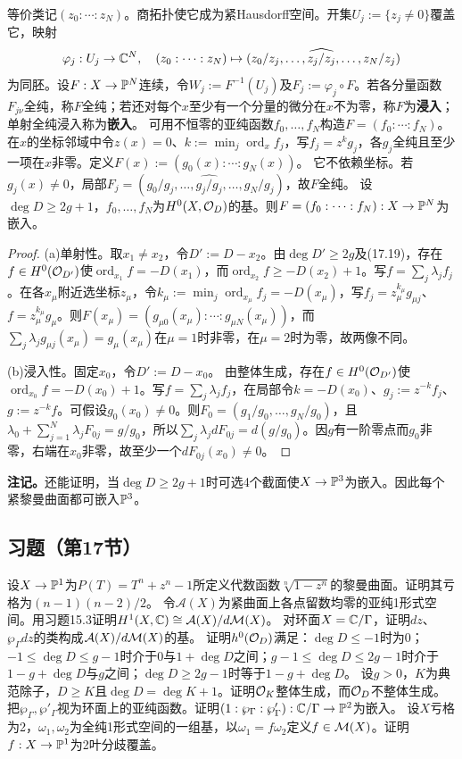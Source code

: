 等价类记$(z_0:\cdots:z_N)$。商拓扑使它成为紧Hausdorff空间。开集$U_j:=\{z_j\ne0\}$覆盖它，映射
\[
\varphi_j:U_j\to\mathbb C^N,\quad(z_0:\cdots:z_N)\mapsto(z_0/z_j,\ldots,\widehat{z_j/z_j},\ldots,z_N/z_j)
\]
为同胚。设$F:X\to\mathbb P^N$连续，令$W_j:=F^{-1}(U_j)$及$F_j:=\varphi_j\circ F$。若各分量函数$F_{j\nu}$全纯，称$F$全纯；若还对每个$x$至少有一个分量的微分在$x$不为零，称$F$为\textbf{浸入}；单射全纯浸入称为\textbf{嵌入}。
可用不恒零的亚纯函数$f_0,\ldots,f_N$构造$F=(f_0:\cdots:f_N)$。在$x$的坐标邻域中令$z(x)=0$、$k:=\min_j\operatorname{ord}_xf_j$，写$f_j=z^kg_j$，各$g_j$全纯且至少一项在$x$非零。定义$F(x):=(g_0(x):\cdots:g_N(x))$。
它不依赖坐标。若$g_j(x)\ne0$，局部$F_j=(g_0/g_j,\ldots,\widehat{g_j/g_j},\ldots,g_N/g_j)$，故$F$全纯。
设$\deg D\ge2g+1$，$f_0,\ldots,f_N$为$H^0(X,\mathcal O_D)$的基。则$F=(f_0:\cdots:f_N):X\to\mathbb P^N$为嵌入。
\begin{proof}
(a)单射性。取$x_1\ne x_2$，令$D':=D-x_2$。由$\deg D'\ge2g$及(17.19)，存在$f\in H^0(\mathcal O_{D'})$使$\operatorname{ord}_{x_1}f=-D(x_1)$，而$\operatorname{ord}_{x_2}f\ge-D(x_2)+1$。写$f=\sum_j\lambda_jf_j$。在各$x_\mu$附近选坐标$z_\mu$，令$k_\mu:=\min_j\operatorname{ord}_{x_\mu}f_j=-D(x_\mu)$，写$f_j=z_\mu^{k_\mu}g_{\mu j}$、$f=z_\mu^{k_\mu}g_\mu$。则$F(x_\mu)=(g_{\mu0}(x_\mu):\cdots:g_{\mu N}(x_\mu))$，而$\sum_j\lambda_jg_{\mu j}(x_\mu)=g_\mu(x_\mu)$在$\mu=1$时非零，在$\mu=2$时为零，故两像不同。

(b)浸入性。固定$x_0$，令$D':=D-x_0$。
由整体生成，存在$f\in H^0(\mathcal O_{D'})$使$\operatorname{ord}_{x_0}f=-D(x_0)+1$。写$f=\sum_j\lambda_jf_j$，在局部令$k=-D(x_0)$、$g_j:=z^{-k}f_j$、$g:=z^{-k}f$。可假设$g_0(x_0)\ne0$。则$F_0=(g_1/g_0,\ldots,g_N/g_0)$，且$\lambda_0+\sum_{j=1}^N\lambda_jF_{0j}=g/g_0$，所以$\sum_j\lambda_jdF_{0j}=d(g/g_0)$。因$g$有一阶零点而$g_0$非零，右端在$x_0$非零，故至少一个$dF_{0j}(x_0)\ne0$。
\end{proof}
\textbf{注记。}还能证明，当$\deg D\ge2g+1$时可选4个截面使$X\to\mathbb P^3$为嵌入。因此每个紧黎曼曲面都可嵌入$\mathbb P^3$。
\subsection*{习题（第17节）}
设$X\to\mathbb P^1$为$P(T)=T^n+z^n-1$所定义代数函数$\sqrt[n]{1-z^n}$的黎曼曲面。证明其亏格为$(n-1)(n-2)/2$。
令$\mathcal A(X)$为紧曲面上各点留数均零的亚纯1形式空间。用习题15.3证明$H^1(X,\mathbb C)\cong\mathcal A(X)/d\mathcal M(X)$。
对环面$X=\mathbb C/\Gamma$，证明$dz$、$\wp_\Gamma dz$的类构成$\mathcal A(X)/d\mathcal M(X)$的基。
证明$h^0(\mathcal O_D)$满足：$\deg D\le-1$时为0；$-1\le\deg D\le g-1$时介于0与$1+\deg D$之间；$g-1\le\deg D\le2g-1$时介于$1-g+\deg D$与$g$之间；$\deg D\ge2g-1$时等于$1-g+\deg D$。
设$g>0$，$K$为典范除子，$D\ge K$且$\deg D=\deg K+1$。证明$\mathcal O_K$整体生成，而$\mathcal O_D$不整体生成。
把$\wp_\Gamma,\wp'_\Gamma$视为环面上的亚纯函数。证明$(1:\wp_\Gamma:\wp'_\Gamma):\mathbb C/\Gamma\to\mathbb P^2$为嵌入。
设$X$亏格为2，$\omega_1,\omega_2$为全纯1形式空间的一组基，以$\omega_1=f\omega_2$定义$f\in\mathcal M(X)$。证明$f:X\to\mathbb P^1$为2叶分歧覆盖。
